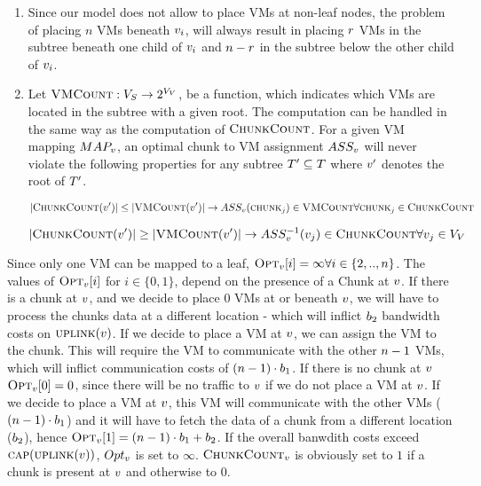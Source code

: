\begin{enumerate}
 \item Since our model does not allow to place VMs at non-leaf nodes, 
the problem of placing $n$ VMs beneath $v_i$, will always result in
placing $r$ VMs in the subtree 
beneath one child of $v_i$ and $n - r$ in the subtree below 
the other child of $v_i$. 
\item Let $\textsc{VMCount} : V_S \rightarrow 2^{V_V}$, be a 
function, which indicates which VMs are located in the subtree with a given 
root. The computation can be handled in the same way as the computation of 
$\textsc{ChunkCount}$. For a given VM mapping $MAP_v$, an optimal chunk to VM 
assignment $ASS_v$ will never violate the following properties for 
any subtree $T' \subseteq T$ where $v'$ denotes the root of 
$T'$.

$$ |\textsc{ChunkCount}(v')| \leq |\textsc{VMCount}(v')| \rightarrow 
ASS_v(\textsc{chunk}_j) \in \textsc{VMCount} \forall \textsc{chunk}_j \in \textsc{ChunkCount}$$

$$ |\textsc{ChunkCount}(v')| \geq |\textsc{VMCount}(v')| \rightarrow 
ASS_v^{-1}(v_j) \in \textsc{ChunkCount} \forall v_j \in 
V_V$$
\end{enumerate}

Since only one VM can be mapped to a leaf, $\textsc{Opt}_{v}[i] = 
\infty \forall i \in \{2,..,n\}$. The values of 
$\textsc{Opt}_{v}[i]$ for $i \in \{0,1\}$, depend on the presence of a Chunk 
at $v$. If there is a chunk at $v$, and we decide to 
place $0$ VMs at or beneath $v$, we will have to process the chunks 
data at a different location - which will inflict $b_2$ bandwidth costs 
on $\textsc{uplink}(v)$. If we decide to place a VM at $v$, 
we can assign the VM to the chunk. This will require the VM to communicate with 
the other $n -1$ VMs, which will inflict communication costs of $(n -1) 
\cdot b_1$. If there is no chunk at $v$ 
$\textsc{Opt}_{v}[0] = 0$, since there will be no traffic to 
$v$ if we do not place a VM at $v$. If we decide to 
place a VM at $v$, this VM will communicate with the other VMs 
($(n -1) \cdot b_1$) and it will have to fetch the data of a chunk from 
a different location ($b_2$), hence $\textsc{Opt}_{v}[1] = (n -1 
)\cdot b_1  + b_2$. If the overall banwdith costs exceed 
$\textsc{cap}(\textsc{uplink}(v))$, $Opt_{v}$ is set to $\infty$.
$\textsc{ChunkCount}_{v}$ is obviously set to 
$1$ if a 
chunk is present at $v$ and otherwise to $0$.

